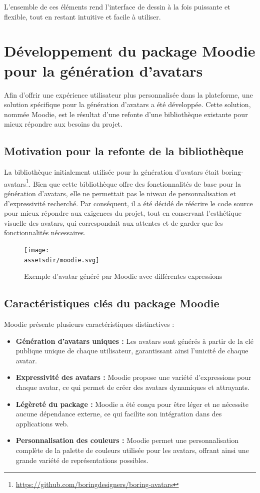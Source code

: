 L'ensemble de ces éléments rend l'interface de dessin à la fois puissante et flexible, tout en restant intuitive et facile à utiliser.

\section{Développement du package Moodie pour la génération d'avatars\label{moodie}}

Afin d'offrir une expérience utilisateur plus personnalisée dans la plateforme, une solution spécifique pour la génération d'avatars a été développée. Cette solution, nommée Moodie, est le résultat d'une refonte d'une bibliothèque existante pour mieux répondre aux besoins du projet.

\subsection{Motivation pour la refonte de la bibliothèque}

La bibliothèque initialement utilisée pour la génération d'avatars était boring-avatars\footnote{\url{https://github.com/boringdesigners/boring-avatars}}. Bien que cette bibliothèque offre des fonctionnalités de base pour la génération d'avatars, elle ne permettait pas le niveau de personnalisation et d'expressivité recherché. Par conséquent, il a été décidé de réécrire le code source pour mieux répondre aux exigences du projet, tout en conservant l'esthétique visuelle des avatars, qui correspondait aux attentes et de garder que les fonctionnalités nécessaires.

\begin{figure}[H]
    \centering
    \texttt{[image: \\assetsdir/moodie.svg]}
    \caption{Exemple d'avatar généré par Moodie avec différentes expressions}
\end{figure}

\subsection{Caractéristiques clés du package Moodie}

Moodie présente plusieurs caractéristiques distinctives :

\begin{itemize}
    \item \textbf{Génération d'avatars uniques :} Les avatars sont générés à partir de la clé publique unique de chaque utilisateur, garantissant ainsi l'unicité de chaque avatar.
    \item \textbf{Expressivité des avatars :} Moodie propose une variété d'expressions pour chaque avatar, ce qui permet de créer des avatars dynamiques et attrayants.
    \item \textbf{Légèreté du package :} Moodie a été conçu pour être léger et ne nécessite aucune dépendance externe, ce qui facilite son intégration dans des applications web.
    \item \textbf{Personnalisation des couleurs :} Moodie permet une personnalisation complète de la palette de couleurs utilisée pour les avatars, offrant ainsi une grande variété de représentations possibles.
\end{itemize}

